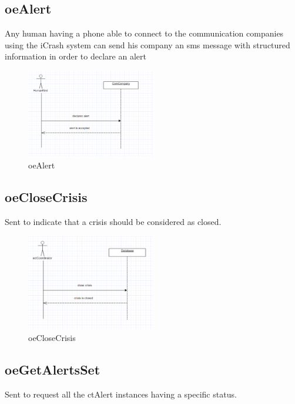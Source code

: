 \subsection{oeAlert}
Any human having a phone able to connect to the communication companies using
the iCrash system can send his company an sms message with structured
information in order to declare an alert

\begin{figure}[H]
\begin{center}
\includegraphics[width=0.5\textwidth]{./images/oeAlert.eps} 
\end{center}
\caption{oeAlert}
\end{figure}

\subsection{oeCloseCrisis}
Sent to indicate that a crisis should be considered as closed.

\begin{figure}[H]
\begin{center}
\includegraphics[width=0.5\textwidth]{./images/oeCloseCrisis.eps} 
\end{center}
\caption{oeCloseCrisis}
\end{figure}

\subsection{oeGetAlertsSet}
Sent to request all the ctAlert instances having a specific status.

